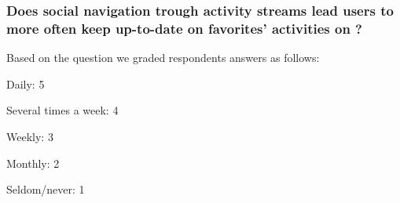 %
% 

\subsubsection{%
  Does social navigation trough activity streams lead users to more often keep
  up-to-date on favorites' activities on \urort{}?
}

Based on the question
we graded respondents answers as follows: 

\begin{items}
  \item Daily: 5
  \item Several times a week: 4
  \item Weekly: 3
  \item Monthly: 2
  \item Seldom/never: 1
\end{items}

